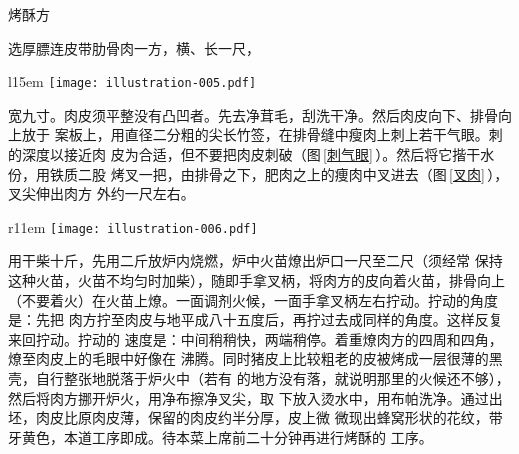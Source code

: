 \begin{recipe}{烤酥方}

\ingredients


\preparation

\step[选料及处理] 选厚膘连皮带肋骨肉一方，横、长一尺，
\begin{wrapfigure}[9]{l}{15em}%
\centering%
\vspace{-.875\baselineskip}%
\texttt{[image: illustration-005.pdf]}%
\vspace{-.125\baselineskip}%
\caption{刺气眼}
\label{刺气眼}
\end{wrapfigure}
宽九寸。肉皮须平整没有凸凹者。先去净茸毛，刮洗干净。然后肉皮向下、排骨向上放于
案板上，用直径二分粗的尖长竹签，在排骨缝中瘦肉上刺上若干气眼。刺的深度以接近肉
皮为合适，但不要把肉皮刺破（图\,\ref{刺气眼}\,）。然后将它揩干水份，用铁质二股
烤叉一把，由排骨之下，肥肉之上的痩肉中叉进去（图\,\ref{叉肉}\,），叉尖伸出肉方
外约一尺左右。

\begin{wrapfigure}[13]{r}{11em}%
\centering%
\vspace{-2\baselineskip}%
\texttt{[image: illustration-006.pdf]}%
\vspace{-.625\baselineskip}%
\caption{叉肉}
\label{叉肉}
\end{wrapfigure}
%

\step[出坯] 用干柴十斤，先用二斤放炉内烧燃，炉中火苗燎出炉口一尺至二尺（须经常
保持这种火苗，火苗不均匀时加柴），随即手拿叉柄，将肉方的皮向着火苗，排骨向上
（不要着火）在火苗上燎。一面调剂火候，一面手拿叉柄左右拧动。拧动的角度是：先把
肉方拧至肉皮与地平成八十五度后，再拧过去成同样的角度。这样反复来回拧动。拧动的
速度是：中间稍稍快，两端稍停。着重燎肉方的四周和四角，燎至肉皮上的毛眼中好像在
沸腾。同时猪皮上比较粗老的皮被烤成一层很薄的黑壳，自行整张地脱落于炉火中（若有
的地方没有落，就说明那里的火候还不够），然后将肉方挪开炉火，用净布擦净叉尖，取
下放入烫水中，用布帕洗净。通过出坯，肉皮比原肉皮薄，保留的肉皮约半分厚，皮上微
微现出蜂窝形状的花纹，带牙黄色，本道工序即成。待本菜上席前二十分钟再进行烤酥的
工序。


\end{recipe}
